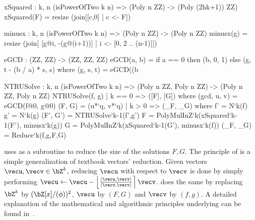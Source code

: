 \begin{code}
  xSquared : {k, n} (isPowerOfTwo k n) => (Poly n ZZ) -> (Poly (2^^(k+1)) ZZ)
  xSquared(F) = resize (join[[c,0] | c <- F])

  minusx : {k, n} (isPowerOfTwo k n) => (Poly n ZZ) -> (Poly n ZZ)
  minusx(g) = resize (join[ [g@i, -(g@(i+1))] | i <- [0, 2 .. (n-1)]])

  eGCD : (ZZ, ZZ) -> (ZZ, ZZ, ZZ)
  eGCD(a, b) =
    if a == 0
    then (b, 0, 1)
    else (g, t - (b / a) * s, s) where
      (g, s, t) = eGCD((b%

  NTRUSolve : {k, n} (isPowerOfTwo k n) =>
    (Poly n ZZ, Poly n ZZ) -> (Poly n ZZ, Poly n ZZ)
  NTRUSolve(f, g)
    | k == 0 => ([F], [G]) where
        (gcd, u, v) = eGCD(f@0, g@0)
        (F, G) = (u*`q, v*`q)
    | k >  0 => (_F, _G) where 
        f' = N`{k}(f)
        g' = N`{k}(g)
        (F', G') = NTRUSolve`{k-1}(f',g')
        F = PolyMulInZ`{k}(xSquared`{k-1}(F'), minusx`{k}(g))
        G = PolyMulInZ`{k}(xSquared`{k-1}(G'), minusx`{k}(f)) 
        (_F, _G) = Reduce`{k}(f,g,F,G)
\end{code}

 \ntrusolve uses \longreduce as a subroutine to reduce the size of the solutions $F,G$.
 The principle of \reduce is a simple generalization of textbook vectors' reduction. Given vectors $\vecu, \vecv \in \bZ^k$, reducing $\vecu$ with respect to $\vecv$ is done by simply performing $\vecu \gets \vecu - \left\lfloor \frac{ \inner{\vecu}{\vecv} }{ \inner{\vecv}{\vecv} } \right\rceil \vecv$. \reduce does the same by replacing $\bZ^k$ by $(\bZ[x]/(\phi))^2$, $\vecu$ by $(F,G)$ and $\vecv$ by $ (f,g)$. A detailed explanation of the mathematical and algorithmic principles underlying \ntrusolve can be found in~\cite{PKC:PorPre19}.
 
  \begin{algorithm}[!htp]
  \caption{$\reduce(f,g,F,G)$}\label{alg:reduce}
 \begin{algorithmic}[1]
  
  \Do
  \end{algorithmic}
 \end{algorithm}

